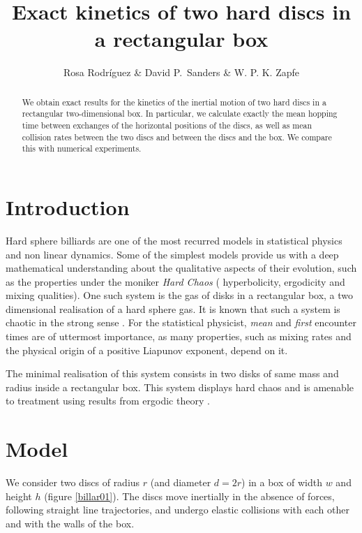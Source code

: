 \documentclass[a4paper,10pt, jcp, aps, preprint]{revtex4-1}
\title{Exact kinetics of two hard discs in a rectangular box}
\author{Rosa Rodríguez \& David P.~Sanders \& W. P. K. Zapfe}
\affil{Departamento de Física, Facultad de Ciencias, Universidad Nacional Autónoma de México, Ciudad Universitaria, Del.~Coyoacán, México D.F. 04510, Mexico}
\begin{document}
\maketitle

\begin{abstract}
  We obtain exact results for the kinetics of the inertial motion of 
two hard discs in a rectangular two-dimensional box.
  In particular,  we calculate exactly the mean hopping time between exchanges
 of the horizontal positions of the discs, 
as well as mean collision rates between the two discs and 
 between the discs and the box. We compare this with numerical experiments.
\end{abstract}

\section{Introduction}

Hard sphere billiards are one of the most recurred models in
statistical physics and non linear dynamics.  Some of the simplest models
 provide us with a deep mathematical understanding
about the qualitative aspects of their evolution, such as 
the properties under the moniker \emph{Hard Chaos} (
hyperbolicity, ergodicity and mixing qualities). One such system is the
gas of disks in a rectangular box, a two dimensional realisation of a
hard sphere gas. It is known that such a system is chaotic in the
strong sense \cite{Sinai70}. 
For the statistical physicist, \emph{mean} and \emph{first} encounter
times are of uttermost importance, as many properties,
such as mixing rates and the physical origin of a positive
Liapunov exponent, depend on it. 


The minimal realisation of this
system consists in two disks of same mass and radius inside a 
rectangular box. This system displays hard chaos and 
is amenable to treatment using
results from ergodic theory \cite{Sinai70, Gallavotti74, SzaszBook00}. 


\section{Model}

We consider two discs of radius $r$ (and diameter $d=2r$) 
in a box of width $w$ and height $h$ (figure
\ref{billar01}). 
The discs move inertially in the absence of forces, 
following straight line trajectories,
and undergo elastic collisions with each 
other and with the walls of the box.
\end{document}
